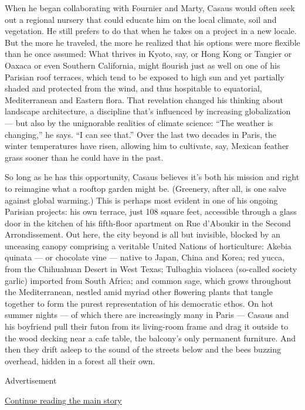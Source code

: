 When he began collaborating with Fournier and Marty, Casaus would often
seek out a regional nursery that could educate him on the local climate,
soil and vegetation. He still prefers to do that when he takes on a
project in a new locale. But the more he traveled, the more he realized
that his options were more flexible than he once assumed: What thrives
in Kyoto, say, or Hong Kong or Tangier or Oaxaca or even Southern
California, might flourish just as well on one of his Parisian roof
terraces, which tend to be exposed to high sun and yet partially shaded
and protected from the wind, and thus hospitable to equatorial,
Mediterranean and Eastern flora. That revelation changed his thinking
about landscape architecture, a discipline that's influenced by
increasing globalization --- but also by the unignorable realities of
climate science: ``The weather is changing,'' he says. ``I can see
that.'' Over the last two decades in Paris, the winter temperatures have
risen, allowing him to cultivate, say, Mexican feather grass sooner than
he could have in the past.

So long as he has this opportunity, Casaus believes it's both his
mission and right to reimagine what a rooftop garden might be.
(Greenery, after all, is one salve against global warming.) This is
perhaps most evident in one of his ongoing Parisian projects: his own
terrace, just 108 square feet, accessible through a glass door in the
kitchen of his fifth-floor apartment on Rue d'Aboukir in the Second
Arrondissement. Out here, the city beyond is all but invisible, blocked
by an unceasing canopy comprising a veritable United Nations of
horticulture: Akebia quinata --- or chocolate vine --- native to Japan,
China and Korea; red yucca, from the Chihuahuan Desert in West Texas;
Tulbaghia violacea (so-called society garlic) imported from South
Africa; and common sage, which grows throughout the Mediterranean,
nestled amid myriad other flowering plants that tangle together to form
the purest representation of his democratic ethos. On hot summer nights
--- of which there are increasingly many in Paris --- Casaus and his
boyfriend pull their futon from its living-room frame and drag it
outside to the wood decking near a cafe table, the balcony's only
permanent furniture. And then they drift asleep to the sound of the
streets below and the bees buzzing overhead, hidden in a forest all
their own.

Advertisement

\protect\hyperlink{after-bottom}{Continue reading the main story}

